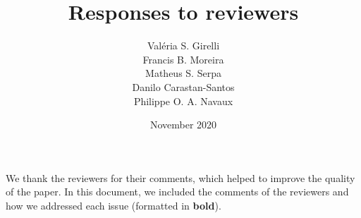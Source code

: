\documentclass{article}
\title{Responses to reviewers}
\author{Valéria S. Girelli\\Francis B. Moreira\\Matheus S. Serpa\\Danilo Carastan-Santos\\Philippe O. A. Navaux}
\date{November 2020}
\begin{document}
\maketitle

We thank the reviewers for their comments, which helped to improve the quality of the paper.
In this document, we included the comments of the reviewers and how we addressed each issue (formatted in \textbf{bold}).





                
            
            
            
            
\end{document}
